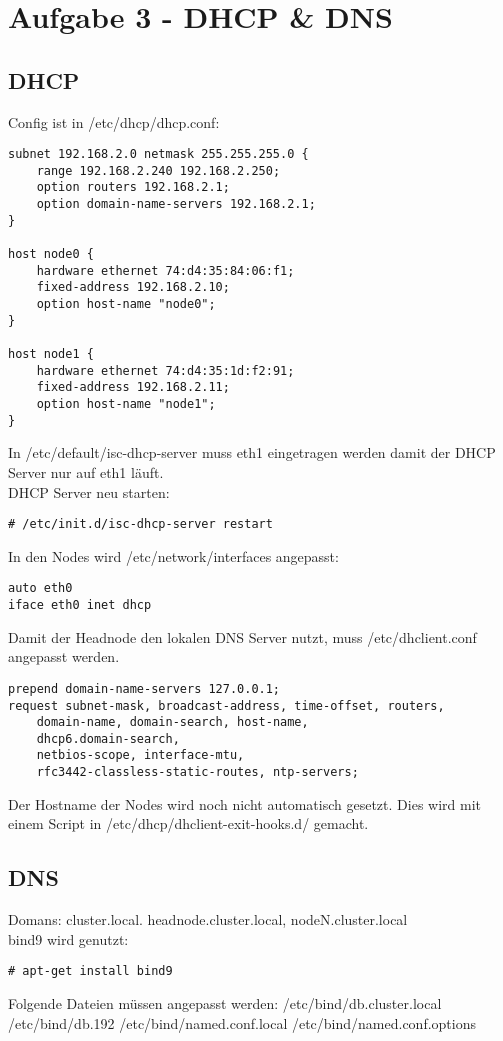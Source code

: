 \chapter{Aufgabe 3 - DHCP \& DNS}
\section{DHCP}
Config ist in /etc/dhcp/dhcp.conf:
\begin{lstlisting}[style=Bash]
subnet 192.168.2.0 netmask 255.255.255.0 {
	range 192.168.2.240 192.168.2.250;
	option routers 192.168.2.1;
	option domain-name-servers 192.168.2.1;
}

host node0 {
	hardware ethernet 74:d4:35:84:06:f1;
	fixed-address 192.168.2.10;
	option host-name "node0";
}

host node1 {
	hardware ethernet 74:d4:35:1d:f2:91;
	fixed-address 192.168.2.11;
	option host-name "node1";
}
\end{lstlisting}
In /etc/default/isc-dhcp-server muss eth1 eingetragen werden damit der DHCP Server nur auf eth1 läuft.\\
DHCP Server neu starten:
\begin{lstlisting}[style=Bash]
# /etc/init.d/isc-dhcp-server restart
\end{lstlisting}
In den Nodes wird /etc/network/interfaces angepasst:
\begin{lstlisting}[style=Bash]
auto eth0
iface eth0 inet dhcp
\end{lstlisting}
Damit der Headnode den lokalen DNS Server nutzt, muss /etc/dhclient.conf angepasst werden.
\begin{lstlisting}[style=Bash]
prepend domain-name-servers 127.0.0.1;
request subnet-mask, broadcast-address, time-offset, routers,
	domain-name, domain-search, host-name,
	dhcp6.domain-search,
	netbios-scope, interface-mtu,
	rfc3442-classless-static-routes, ntp-servers;
\end{lstlisting}
Der Hostname der Nodes wird noch nicht automatisch gesetzt. Dies wird mit einem Script in /etc/dhcp/dhclient-exit-hooks.d/ gemacht.
\section{DNS}
Domans: cluster.local. headnode.cluster.local, nodeN.cluster.local\\
bind9 wird genutzt:
\begin{lstlisting}[style=Bash]
# apt-get install bind9
\end{lstlisting}
Folgende Dateien müssen angepasst werden:
/etc/bind/db.cluster.local
/etc/bind/db.192
/etc/bind/named.conf.local
/etc/bind/named.conf.options
